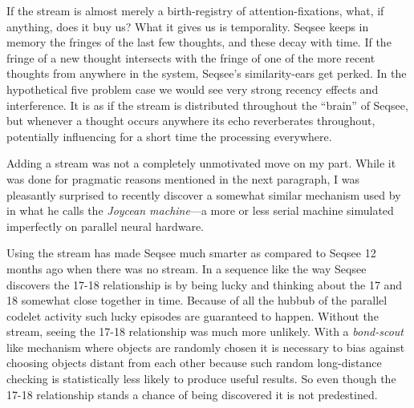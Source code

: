 \documentclass[letterpaper]{article}
\begin{document}
If the stream is almost merely a birth-registry of attention-fixations, what, if anything, does it buy us? What it gives us is temporality.  Seqsee keeps in memory the fringes of the last few thoughts, and these decay with time.  If the fringe of a new thought intersects with the fringe of one of the more recent thoughts from anywhere in the system, Seqsee's similarity-ears get perked.  In the hypothetical five problem case we would see very strong recency effects and interference.  It is as if the stream is distributed throughout the ``brain'' of Seqsee, but whenever a thought occurs anywhere its echo reverberates throughout, potentially influencing for a short time the processing everywhere.

 Adding a stream was not a completely unmotivated move on my part. While it was done for pragmatic reasons mentioned in the next paragraph, I was pleasantly surprised to recently discover a somewhat similar mechanism used by  in what he calls the \emph{Joycean machine}---a more or less serial machine simulated imperfectly on parallel neural hardware.

Using the stream has made Seqsee much smarter as compared to Seqsee 12 months ago when there was no stream.  In a sequence like  the way Seqsee discovers the 17-18 relationship is by being lucky and thinking about the 17 and 18 somewhat close together in time.  Because of all the hubbub of the parallel codelet activity such lucky episodes are guaranteed to happen.  Without the stream, seeing the 17-18 relationship was much more unlikely.  With a \emph{bond-scout} like mechanism where objects are randomly chosen it is necessary to bias against choosing objects distant from each other because such random long-distance checking is statistically less likely to produce useful results.  So even though the 17-18 relationship stands a chance of being discovered it is not predestined.


\end{document}
